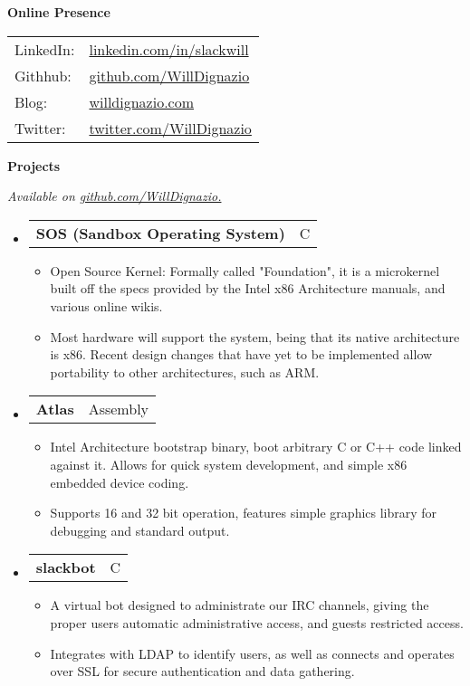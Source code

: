 \documentclass[letterpaper,11pt]{article}
\makeatletter
\newcommand{\resheading}[1]{{\large \colorbox{mygrey}{\begin{minipage}{\textwidth}{\textbf{#1 \vphantom{p\^{E}}}}\end{minipage}}}}
\newcommand{\restwosubheading}[2]{
\begin{tabular*}{6.5in}{l@{\extracolsep{\fill}}r}
		\textbf{#1} & #2 \\
\end{tabular*}\vspace{-6pt}}
\makeatother
\begin{document}
\resheading{Online Presence}
{
	\begin{tabularx}{2in}{XX}
		LinkedIn: & \href{http://www.linkedin.com/in/slackwill/}{linkedin.com/in/slackwill} \\
		Githhub: & \href{http://www.github.com/WillDignazio}{github.com/WillDignazio} \\
		Blog: & \href{http://www.willdignazio.com/}{willdignazio.com} \\
		Twitter: & \href{https://twitter.com/WillDignazio}{twitter.com/WillDignazio} \\
	\end{tabularx}
}
\pagebreak

\resheading{Projects}
{ \footnotesize
	\textit{Available on {\href{http://www.github.com/WillDignazio/}{github.com/WillDignazio.}}}
	\begin{itemize}
		\item 
		\restwosubheading{SOS (Sandbox Operating System) }{C}
			\begin{itemize}
				\item{Open Source Kernel: Formally called "Foundation", it is a microkernel built off the specs provided by the Intel x86 Architecture manuals, and various online wikis.}
				\item{Most hardware will support the system, being that its native architecture is x86. Recent design changes that have yet to be implemented allow portability to other architectures, such as ARM.}
			\end{itemize}
		\item		
		\restwosubheading{Atlas}{Assembly}
			\begin{itemize}
				\item{Intel Architecture bootstrap binary, boot arbitrary C or C++ code linked against it. Allows for quick system development, and simple x86 embedded device coding.} 
				\item{Supports 16 and 32 bit operation, features simple graphics library for debugging and standard output.}
			\end{itemize}
		\item
		\restwosubheading{slackbot}{C}
			\begin{itemize}
				\item{A virtual bot designed to administrate our IRC channels, giving the proper users automatic administrative access, and guests restricted access.}
				\item{Integrates with LDAP to identify users, as well as connects and operates over SSL for secure authentication and data gathering.}

\end{itemize}
\end{itemize}}
\end{document}
